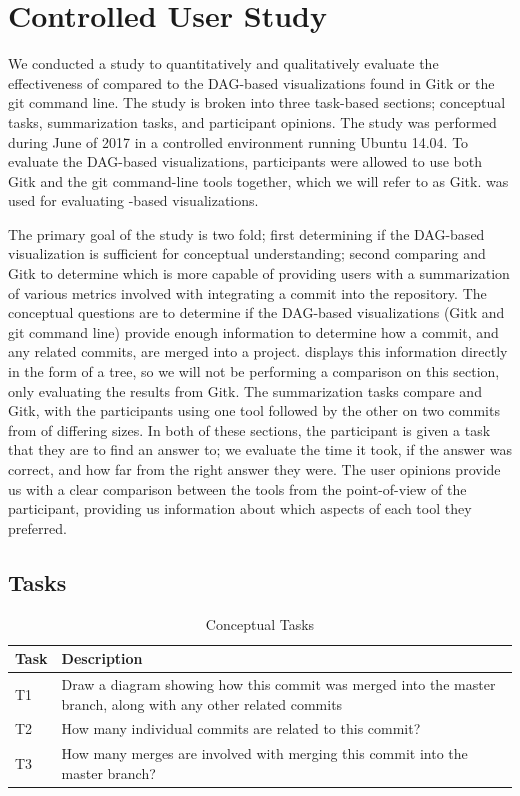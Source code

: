 \section{Controlled User Study}
\label{sec:study}

We conducted a study to quantitatively and qualitatively evaluate the
effectiveness of \tool compared to the DAG-based visualizations found in
Gitk or the git command line. The study is broken into three task-based
sections; conceptual tasks, summarization tasks, and participant
opinions. The study was performed during June of 2017 in a controlled
environment running Ubuntu 14.04. To evaluate the DAG-based
visualizations, participants were allowed to use both Gitk and the git
command-line tools together, which we will refer to as Gitk. \tool was
used for evaluating \mt-based visualizations.

The primary goal of the study is two fold; first determining if the
DAG-based visualization is sufficient for conceptual understanding;
second comparing \tool and Gitk to determine which is more capable of
providing users with a summarization of various metrics involved with
integrating a commit into the repository. The conceptual questions are
to determine if the DAG-based visualizations (Gitk and git command line)
provide enough information to determine how a commit, and any related
commits, are merged into a project. \tool displays this information
directly in the form of a tree, so we will not be performing a
comparison on this section, only evaluating the results from Gitk. The
summarization tasks compare \tool and Gitk, with the participants using
one tool followed by the other on two commits from  of
differing sizes. In both of these sections, the participant is given a
task that they are to find an answer to; we evaluate the time it took,
if the answer was correct, and how far from the right answer they were.
The user opinions provide us with a clear comparison between the tools
from the point-of-view of the participant, providing us information
about which aspects of each tool they preferred.

\subsection{Tasks}
\label{sub:tasks}

\begin{table}[htpb]
  \centering
  \caption{Conceptual Tasks }
  \label{tab:conceptual_tasks}
  \begin{tabulary}{0.9\textwidth}{LL}
    \toprule
    Task & Description\\
    \midrule
    T1 & Draw a diagram showing how this commit was merged into the master branch, along with any other related commits\\
    T2 & How many individual commits are related to this commit?\\
    T3 & How many merges are involved with merging this commit into the master branch?\\
    \bottomrule
  \end{tabulary}
\end{table}

